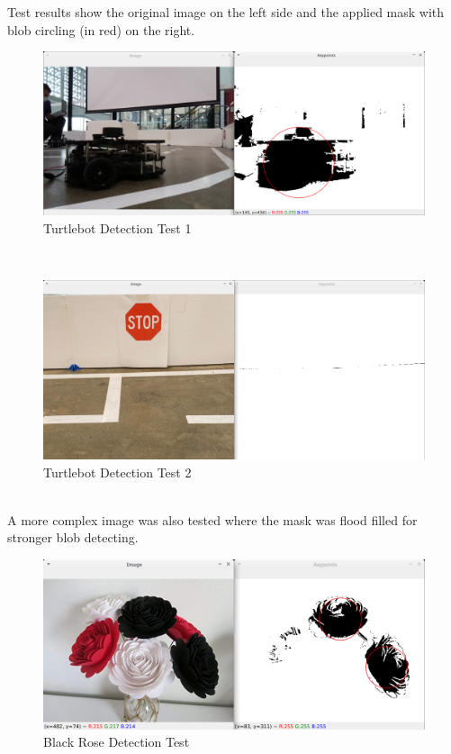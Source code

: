 \documentclass[11pt]{article}
\begin{document}
\begin{appendices}
    Test results show the original image on the left side and the applied mask with blob circling (in red) on the right.

    \begin{figure}[h!]
        \centering
        \includegraphics[width=160mm]{../test/blob/results/black_blob_1.png}
        \caption{Turtlebot Detection Test 1}
        \label{fig:turtlebot_detect_test_1}
    \end{figure}
    ~\\

    \begin{figure}[h!]
        \centering
        \includegraphics[width=160mm]{../test/blob/results/black_blob_2.png}
        \caption{Turtlebot Detection Test 2}
        \label{fig:turtlebot_detect_test_2}
    \end{figure}
    ~\\

    A more complex image was also tested where the mask was flood filled for stronger blob detecting.

    \begin{figure}[h!]
        \centering
        \includegraphics[width=160mm]{../test/blob/results/black_blob_3.png}
        \caption{Black Rose Detection Test}
        \label{fig:black_rose_detect_test}
    \end{figure}
    ~\\


\end{appendices}
\end{document}
